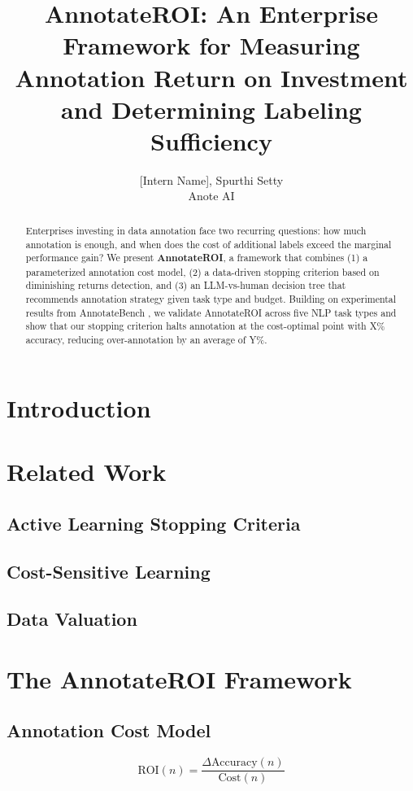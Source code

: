 \documentclass{article}
\title{AnnotateROI: An Enterprise Framework for Measuring Annotation Return on Investment and Determining Labeling Sufficiency}
\author{[Intern Name], Spurthi Setty \\
Anote AI}
\date{}
\begin{document}
\maketitle

\begin{abstract}
\noindent
Enterprises investing in data annotation face two recurring questions: how much annotation is enough, and when does the cost of additional labels exceed the marginal performance gain? We present \textbf{AnnotateROI}, a framework that combines (1) a parameterized annotation cost model, (2) a data-driven stopping criterion based on diminishing returns detection, and (3) an LLM-vs-human decision tree that recommends annotation strategy given task type and budget. Building on experimental results from AnnotateBench \cite{annotatebench}, we validate AnnotateROI across five NLP task types and show that our stopping criterion halts annotation at the cost-optimal point with X\% accuracy, reducing over-annotation by an average of Y\%.
\end{abstract}

\section{Introduction}

\section{Related Work}
\subsection{Active Learning Stopping Criteria}
\subsection{Cost-Sensitive Learning}
\subsection{Data Valuation}

\section{The AnnotateROI Framework}
\subsection{Annotation Cost Model}
\begin{equation}
\text{ROI}(n) = \frac{\Delta \text{Accuracy}(n)}{\text{Cost}(n)}
\end{equation}
\end{document}
